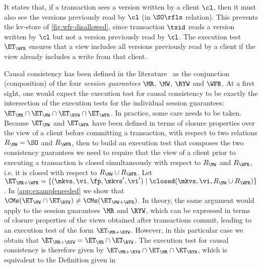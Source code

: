 

It states that, if a transaction sees a version written by a
client $\cl$, then it must also see the versions previously read by $\cl$ (in $\SO\rflx$ relation).
This prevents the kv-store of \cref{fig:wfr-disallowed},
since transaction $\txid$ reads a version written by $\cl$ but
not a version previously read by $\cl$.
The execution test $\ET_{\WFR}$ ensures
that a view includes all versions previously read by a client 
if the view already includes a write from that client. 

Causal consistency has been defined in the literature~\cite{session2causal} 
as the conjunction (composition) of the four \emph{session guarantees} \(\MR\), \(\MW\), \(\RYW\) and \(\WFR\). 
At a first sight, one would expect the execution test for causal consistency to be exactly 
the intersection of the execution tests for the individual session guarantees: $\ET_{\MR} \cap \ET_{\MW} \cap \ET_{\RYW} \cap 
\ET_{\WFR}$. In practice, some care needs to be taken. Because $\ET_{\MW}$ and $\ET_{\WFR}$ have been 
defined in terms of closure properties over the view of a client before committing a transaction, with respect 
to two relations $R_{\MW} = \SO$ and $R_{\WFR}$, then to build an execution test that composes the two 
consistency guarantees we need to require that the view of a client prior to executing a transaction is 
closed simultaneously with respect to $R_{\MW}$ and $R_{\WFR}$, i.e. it is closed with respect to 
$R_{\MW} \cup R_{\WFR}$. Let $\ET_{\MR+\WFR} = \{(\mkvs, \vi, \fp, \mkvs', \vi') \mid \closed(\mkvs, \vi, R_{\MW} \cup R_{\WFR})\}$. 
In \cref{app:exampleneeded} we show that $\CMs(\ET_{\MW} \cap \ET_{\RYW}) \neq \CMs(\ET_{\MW+\WFR})$. 
In theory, the same argument would apply to the session guarantees $\MR$ and $\RYW$, which 
can be expressed in terms of closure properties of the views obtained after transactions commit, leading 
to an execution test of the form $\ET_{\MR+\RYW}$. However, in this particular case we obtain that 
$\ET_{\MR+\RYW} = \ET_{\MR} \cap \ET_{\RYW}$. The execution test for causal consistency is therefore 
given by $\ET_{\MR+\RYW} \cap \ET_{\MR} \cap \ET_{\RYW}$, which is equivalent to the Definition given in 
